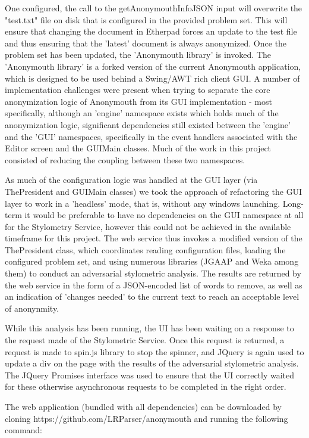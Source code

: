 \documentclass[letterpaper]{article}
\begin{document}
One configured, the call to the getAnonymouthInfoJSON input will
overwrite the "test.txt" file on disk that is configured in the provided problem
set. This will ensure that changing the document in Etherpad forces an
update to the test file and thus ensuring that the 'latest' document
is always anonymized. Once the problem set has been updated, the
'Anonymouth library' is invoked. The 'Anonymouth library' is a forked
version of the current Anonymouth application, which is designed to be
used behind a Swing/AWT rich client GUI. A number of implementation
challenges were present when trying to separate the core anonymization
logic of Anonymouth from its GUI implementation - most specifically,
although an 'engine' namespace exists which holds much of the
anonymization logic, significant dependencies still existed between
the 'engine' and the 'GUI' namespaces, specifically in the event
handlers associated with the Editor screen and the GUIMain classes. Much of the work in this
project consisted of reducing the coupling between these two
namespaces.

As much of the configuration logic was handled at the GUI layer (via
ThePresident and GUIMain classes) we took the approach of refactoring
the GUI layer to work in a 'headless' mode, that is, without any
windows launching. Long-term it would be preferable to have no
dependencies on the GUI namespace at all for the Stylometry Service,
however this could not be achieved in the available timeframe for this
project. The web service thus invokes a modified version of the
ThePresident class, which coordinates reading configuration files,
loading the configured problem set, and using numerous libraries
(JGAAP and Weka among them) to conduct an adversarial stylometric
analysis. The results are returned by the web service in the form of a
JSON-encoded list of words to remove, as well as an indication of
'changes needed' to the current text to reach an acceptable level of
anonynmity.

While this analysis has been running, the UI has been waiting on a
response to the request made of the Stylometric Service. Once this
request is returned, a request is made to spin.js library to stop the
spinner, and JQuery is again used to update a div on the page with the
results of the adversarial stylometric analysis. The JQuery Promises
interface was used to ensure that the UI correctly waited for these
otherwise asynchronous requests to be completed in the right order.

The web application (bundled with all dependencies) can be downloaded
by cloning https://github.com/LRParser/anonymouth and running the
following command:
\end{document}
